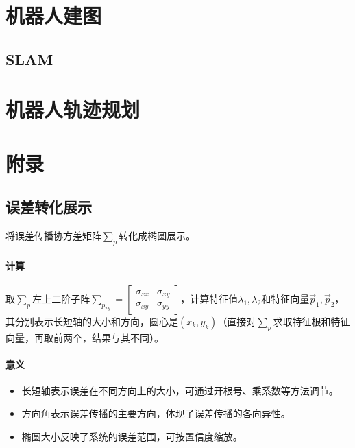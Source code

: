 \documentclass[
12pt, %
a4paper, 
oneside, %
headinclude,footinclude, %
]{scrartcl}
\begin{document}
\section{机器人建图}
\subsection[SLAM]{SLAM}
\section{机器人轨迹规划}
\section{附录}
\subsection[误差转化展示]{误差转化展示}\label{sec:error}
将误差传播协方差矩阵$ \sum_p $转化成椭圆展示。
\paragraph{计算}
取$ \sum_p $左上二阶子阵$ \sum_{p_{xy}} = \begin{bmatrix} \sigma_{xx} & \sigma_{xy} \\ \sigma_{xy} & \sigma_{yy} \end{bmatrix} $，计算特征值$ \lambda_1,\lambda_2 $和特征向量$ \overrightarrow{p}_1,\overrightarrow{p}_2 $，其分别表示长短轴的大小和方向，圆心是$ (x_k, y_k) $（直接对$ \sum_p $求取特征根和特征向量，再取前两个，结果与其不同）。
\paragraph{意义}
\begin{itemize}
\item 长短轴表示误差在不同方向上的大小，可通过开根号、乘系数等方法调节。
\item 方向角表示误差传播的主要方向，体现了误差传播的各向异性。
\item 椭圆大小反映了系统的误差范围，可按置信度缩放。
\end{itemize}
\end{document}
